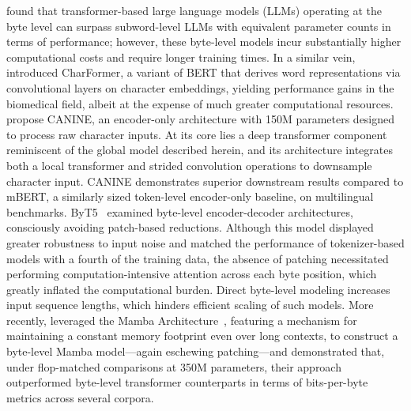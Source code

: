 \cite{Choe2019BridgingTG} found that transformer-based large language models (LLMs) operating at the byte level can surpass subword-level LLMs with equivalent parameter counts in terms of performance; however, these byte-level models incur substantially higher computational costs and require longer training times. In a similar vein, \cite{el2020characterbert} introduced CharFormer, a variant of BERT that derives word representations via convolutional layers on character embeddings, yielding performance gains in the biomedical field, albeit at the expense of much greater computational resources. \cite{clark2022canine} propose CANINE, an encoder-only architecture with 150M parameters designed to process raw character inputs. At its core lies a deep transformer component reminiscent of the global model described herein, and its architecture integrates both a local transformer and strided convolution operations to downsample character input. CANINE demonstrates superior downstream results compared to mBERT, a similarly sized token-level encoder-only baseline, on multilingual benchmarks. ByT5~\citep{xue2022byt5} examined byte-level encoder-decoder architectures, consciously avoiding patch-based reductions. Although this model displayed greater robustness to input noise and matched the performance of tokenizer-based models with a fourth of the training data, the absence of patching necessitated performing computation-intensive attention across each byte position, which greatly inflated the computational burden. Direct byte-level modeling increases input sequence lengths, which hinders efficient scaling of such models. More recently, \cite{wang2024mambabyte} leveraged the Mamba Architecture~\citep{gu2023mamba}, featuring a mechanism for maintaining a constant memory footprint even over long contexts, to construct a byte-level Mamba model—again eschewing patching—and demonstrated that, under flop-matched comparisons at 350M parameters, their approach outperformed byte-level transformer counterparts in terms of bits-per-byte metrics across several corpora.


